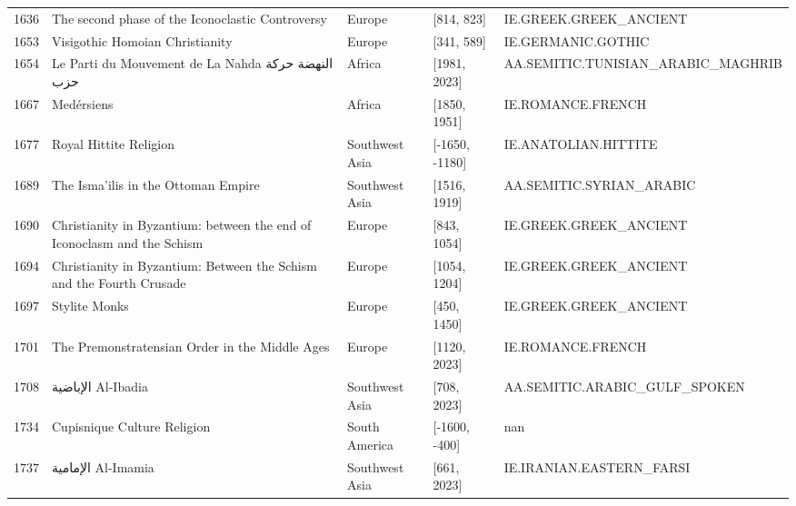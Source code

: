 {\begin{longtable}{rp{3.5cm}llp{3.5cm}}
1636 & {\raggedright The second phase of the Iconoclastic Controversy} & Europe & [814, 823] & {\raggedright IE.\allowbreak{}GREEK.\allowbreak{}GREEK\_\allowbreak{}ANCIENT} \\
1653 & {\raggedright Visigothic Homoian Christianity} & Europe & [341, 589] & {\raggedright IE.\allowbreak{}GERMANIC.\allowbreak{}GOTHIC} \\
1654 & {\raggedright Le Parti du Mouvement de La Nahda {\arabicfont النهضة حركة حزب}} & Africa & [1981, 2023] & {\raggedright AA.\allowbreak{}SEMITIC.\allowbreak{}TUNISIAN\_\allowbreak{}ARABIC\_\allowbreak{}MAGHRIB} \\
1667 & {\raggedright Medérsiens} & Africa & [1850, 1951] & {\raggedright IE.\allowbreak{}ROMANCE.\allowbreak{}FRENCH} \\
1677 & {\raggedright Royal Hittite Religion} & Southwest Asia & [-1650, -1180] & {\raggedright IE.\allowbreak{}ANATOLIAN.\allowbreak{}HITTITE} \\
1689 & {\raggedright The Isma'ilis in the Ottoman Empire} & Southwest Asia & [1516, 1919] & {\raggedright AA.\allowbreak{}SEMITIC.\allowbreak{}SYRIAN\_\allowbreak{}ARABIC} \\
1690 & {\raggedright Christianity in Byzantium: between the end of Iconoclasm and the Schism} & Europe & [843, 1054] & {\raggedright IE.\allowbreak{}GREEK.\allowbreak{}GREEK\_\allowbreak{}ANCIENT} \\
1694 & {\raggedright Christianity in Byzantium: Between the Schism and the Fourth Crusade} & Europe & [1054, 1204] & {\raggedright IE.\allowbreak{}GREEK.\allowbreak{}GREEK\_\allowbreak{}ANCIENT} \\
1697 & {\raggedright Stylite Monks} & Europe & [450, 1450] & {\raggedright IE.\allowbreak{}GREEK.\allowbreak{}GREEK\_\allowbreak{}ANCIENT} \\
1701 & {\raggedright The Premonstratensian Order in the Middle Ages} & Europe & [1120, 2023] & {\raggedright IE.\allowbreak{}ROMANCE.\allowbreak{}FRENCH} \\
1708 & {\raggedright {\arabicfont الإباضية}  Al-Ibadia} & Southwest Asia & [708, 2023] & {\raggedright AA.\allowbreak{}SEMITIC.\allowbreak{}ARABIC\_\allowbreak{}GULF\_\allowbreak{}SPOKEN} \\
1734 & {\raggedright Cupisnique Culture Religion} & South America & [-1600, -400] & {\raggedright nan} \\
1737 & {\raggedright {\arabicfont الإمامية} Al-Imamia} & Southwest Asia & [661, 2023] & {\raggedright IE.\allowbreak{}IRANIAN.\allowbreak{}EASTERN\_\allowbreak{}FARSI} \\

\end{longtable}}

